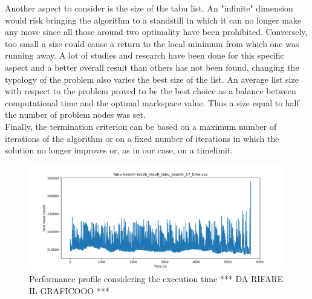 Another aspect to consider is the size of the tabu list. An "infinite" dimension would risk bringing the algorithm to a standstill in which it can no longer make any move since all those around two optimality have been prohibited. Conversely, too small a size could cause a return to the local minimum from which one was running away. A lot of studies and research have been done for this specific aspect \cite{Nababan_2019, Tsubakitani1998} and a better overall result than others has not been found, changing the typology of the problem also varies the best size of the list. An average list size with respect to the problem proved to be the best choice as a balance between computational time and the optimal markspace value. Thus a size equal to half the number of problem nodes was set.\\
Finally, the termination criterion can be based on a maximum number of iterations of the algorithm or on a fixed number of iterations in which the solution no longer improves or, as in our case, on a timelimit.

\begin{figure}[h]
	\centering
	\includegraphics[width=1.0\columnwidth]{../res/gr666_17.png}
	\caption{Performance profile considering the execution time *** DA RIFARE IL GRAFICOOO ***}
	\label{fig:tabu_search_perform_time}
\end{figure}


